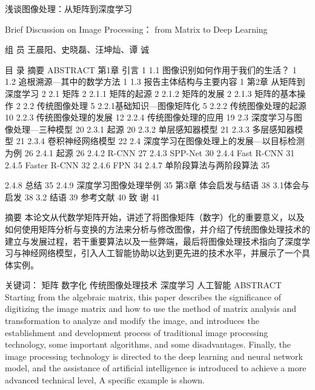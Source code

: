 浅谈图像处理：从矩阵到深度学习

Brief Discussion on Image Processing： from Matrix to Deep Learning


组 员	王晨阳、史晓磊、汪坤灿、谭  诚



目  录
摘要
ABSTRACT
第1章  引言	1
1.1 图像识别如何作用于我们的生活？	1
1.2 追根溯源---其中的数学方法	1
1.3 报告主体结构与主要内容	1
第2章  从矩阵到深度学习	2
2.1 矩阵	2
2.1.1 矩阵的起源	2
2.1.2 矩阵的发展	2
2.1.3 矩阵的基本操作	2
2.2 传统图像处理	5
2.2.1基础知识---图像矩阵化	5
2.2.2 传统图像处理的起源	10
2.2.3 传统图像处理的发展	12
2.2.4 传统图像处理的应用	19
2.3 深度学习与图像处理---三种模型	20
2.3.1 起源	20
2.3.2 单层感知器模型	21
2.3.3 多层感知器模型	21
2.3.4 卷积神经网络模型	22
2.4 深度学习在图像处理上的发展---以目标检测为例	26
2.4.1 起源	26
2.4.2 R-CNN	27
2.4.3 SPP-Net	30
2.4.4 Fast R-CNN	31
2.4.5 Faster R-CNN	32
2.4.6 FPN	34
2.4.7 单阶段算法与两阶段算法	35




2.4.8 总结	35
2.4.9 深度学习图像处理举例	35
第3章  体会启发与结语	38
3.1体会与启发	38
3.2 结语	39
参考文献	40
致  谢	41
































摘要
本论文从代数学矩阵开始，讲述了将图像矩阵（数字）化的重要意义，以及如何使用矩阵分析与变换的方法来分析与修改图像，并介绍了传统图像处理技术的建立与发展过程，若干重要算法以及一些弊端，最后将图像处理技术指向了深度学习与神经网络模型，引入人工智能协助以达到更先进的技术水平，并展示了一个具体实例。

关键词： 矩阵 数字化 传统图像处理技术 深度学习 人工智能
ABSTRACT
  Starting from the algebraic matrix, this paper describes the significance of digitizing the image matrix and how to use the method of matrix analysis and transformation to analyze and modify the image, and introduces the establishment and development process of traditional image processing technology, some important algorithms, and some disadvantages. Finally, the image processing technology is directed to the deep learning and neural network model, and the assistance of artificial intelligence is introduced to achieve a more advanced technical level, A specific example is shown.

